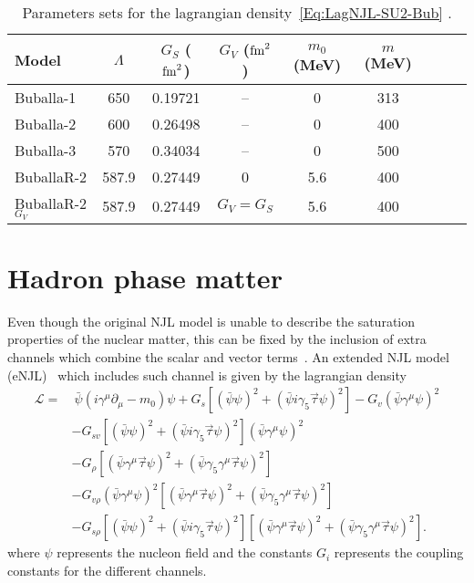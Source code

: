 \documentclass[plainsections,alongposter]{sciposterlocal}
\begin{document}
\begin{multicols}{2}
\begin{table}
\centering
\caption{Parameters sets for the lagrangian density~\eqref{Eq:LagNJL-SU2-Bub} \cite{Buballa1996, Buballa2005}. \label{Tab:Parametros_NJL}}
\begin{tabular}{lcccccccc}
\toprule
Model &  $\Lambda$ & $G_S$ ($\rm{fm}^2$) & $G_V$ ($\rm{fm}^2$) & $m_0$ (MeV) & $m$ (MeV) \\
\midrule
Buballa-1 & 650 & 0.19721 & -- & 0 & 313 \\
Buballa-2 & 600 & 0.26498 & -- & 0 & 400 \\
Buballa-3 & 570 & 0.34034 & -- & 0 & 500 \\
BuballaR-2 & 587.9 & 0.27449 & 0 & 5.6 & 400 \\
BuballaR-2$_{G_V}$ & 587.9 & 0.27449 & $G_V = G_S$ & 5.6 & 400\\
\bottomrule
\end{tabular}
\end{table}

\section*{Hadron phase matter}

Even though the original NJL model is unable to describe the saturation properties of the nuclear matter, this can be fixed by the inclusion of extra channels which combine the scalar and vector terms~\cite{Koch1987}. An extended NJL model (eNJL)~\cite{Pais2016} which includes such channel is given by the lagrangian density
\begin{equation}\label{Eq:Lagrangiana_eNLJ_Pais}
\begin{split}
	\mathcal{L} =&~ \bar{\psi}(i\gamma^\mu\partial_\mu - m_0)\psi + G_s[(\bar{\psi}\psi)^2 + (\bar{\psi}i\gamma_5\vec{\tau}\psi)^2] - G_v(\bar{\psi}\gamma^\mu\psi)^2 \\
	& - G_{sv}[(\bar{\psi}\psi)^2 + (\bar{\psi}i\gamma_5\vec{\tau}\psi)^2](\bar{\psi}\gamma^\mu\psi)^2 \\
	& - G_\rho[(\bar{\psi}\gamma^\mu\vec{\tau}\psi)^2 + (\bar{\psi}\gamma_5\gamma^\mu\vec{\tau}\psi)^2] \\
	& - G_{v\rho}(\bar{\psi}\gamma^\mu\psi)^2[(\bar{\psi}\gamma^\mu\vec{\tau}\psi)^2 + (\bar{\psi}\gamma_5\gamma^\mu\vec{\tau}\psi)^2] \\
	& - G_{s\rho} [(\bar{\psi}\psi)^2 + (\bar{\psi}i\gamma_5\vec{\tau}\psi)^2][(\bar{\psi}\gamma^\mu\vec{\tau}\psi)^2 + (\bar{\psi}\gamma_5\gamma^\mu\vec{\tau}\psi)^2].
\end{split}
\end{equation}
%
where $\psi$ represents the nucleon field and the constants $G_i$ represents the coupling constants for the different channels.


\end{multicols}
\end{document}
